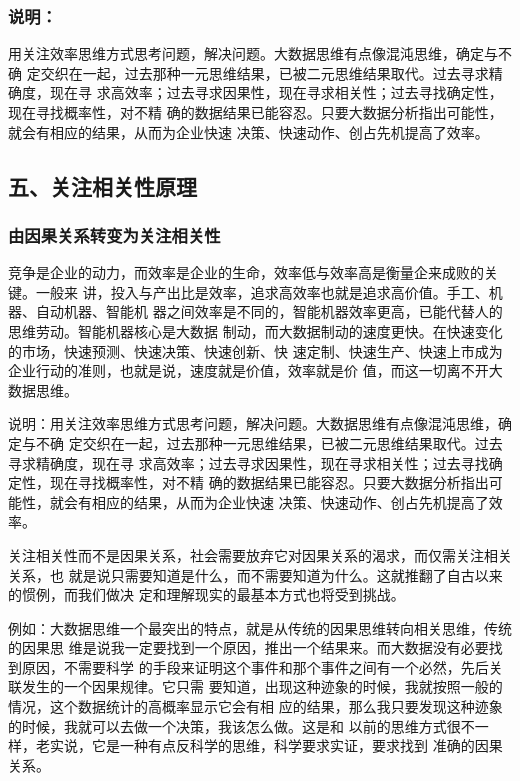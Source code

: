 \documentclass[11pt]{ctexart}
\begin{document}
{{{{\subsubsection{说明：}
\label{sec:orgd949e51}
用关注效率思维方式思考问题，解决问题。大数据思维有点像混沌思维，确定与不确
定交织在一起，过去那种一元思维结果，已被二元思维结果取代。过去寻求精确度，现在寻
求高效率；过去寻求因果性，现在寻求相关性；过去寻找确定性，现在寻找概率性，对不精
确的数据结果已能容忍。只要大数据分析指出可能性，就会有相应的结果，从而为企业快速
决策、快速动作、创占先机提高了效率。

\subsection{五、关注相关性原理}
\label{sec:org50bc63e}

\subsubsection{由因果关系转变为关注相关性}
\label{sec:org90179de}

竞争是企业的动力，而效率是企业的生命，效率低与效率高是衡量企来成败的关键。一般来
讲，投入与产出比是效率，追求高效率也就是追求高价值。手工、机器、自动机器、智能机
器之间效率是不同的，智能机器效率更高，已能代替人的思维劳动。智能机器核心是大数据
制动，而大数据制动的速度更快。在快速变化的市场，快速预测、快速决策、快速创新、快
速定制、快速生产、快速上市成为企业行动的准则，也就是说，速度就是价值，效率就是价
值，而这一切离不开大数据思维。

说明：用关注效率思维方式思考问题，解决问题。大数据思维有点像混沌思维，确定与不确
定交织在一起，过去那种一元思维结果，已被二元思维结果取代。过去寻求精确度，现在寻
求高效率；过去寻求因果性，现在寻求相关性；过去寻找确定性，现在寻找概率性，对不精
确的数据结果已能容忍。只要大数据分析指出可能性，就会有相应的结果，从而为企业快速
决策、快速动作、创占先机提高了效率。

关注相关性而不是因果关系，社会需要放弃它对因果关系的渴求，而仅需关注相关关系，也
就是说只需要知道是什么，而不需要知道为什么。这就推翻了自古以来的惯例，而我们做决
定和理解现实的最基本方式也将受到挑战。

例如：大数据思维一个最突出的特点，就是从传统的因果思维转向相关思维，传统的因果思
维是说我一定要找到一个原因，推出一个结果来。而大数据没有必要找到原因，不需要科学
的手段来证明这个事件和那个事件之间有一个必然，先后关联发生的一个因果规律。它只需
要知道，出现这种迹象的时候，我就按照一般的情况，这个数据统计的高概率显示它会有相
应的结果，那么我只要发现这种迹象的时候，我就可以去做一个决策，我该怎么做。这是和
以前的思维方式很不一样，老实说，它是一种有点反科学的思维，科学要求实证，要求找到
准确的因果关系。

}}}}
\end{document}

